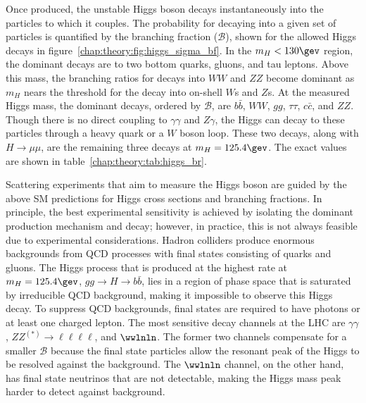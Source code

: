 Once produced, the unstable Higgs boson decays instantaneously into the
particles to which it couples. The probability for decaying into a
given set of particles is quantified by the branching fraction ($\mathscr{B}$), shown
for the allowed Higgs decays in
figure~\ref{chap:theory:fig:higgs_sigma_bf}. In the $m_H < 130 \gev$
region, the dominant decays are to two bottom quarks, gluons, and tau
leptons. Above this mass, the branching ratios for decays into $WW$ and $ZZ$
become dominant as $m_H$ nears the threshold for the decay into
on-shell $W$s and $Z$s. At the measured Higgs mass, the dominant
decays, ordered by $\mathscr{B}$, are $b\bar{b}$, $WW$, $gg$,
$\tau\tau$, $c\bar{c}$, and $ZZ$. Though there is no direct coupling to
$\gamma\gamma$ and $Z\gamma$, the Higgs can decay to these particles
through a heavy quark or a $W$ boson loop. These two decays, along
with $H\rightarrow{\mu\mu}$, are the remaining three decays at $m_H =
125.4 \gev$. The exact values are shown in
table~\ref{chap:theory:tab:higgs_br}. 

Scattering experiments that aim to measure the Higgs boson are guided
by the above SM predictions for Higgs cross sections and branching
fractions. In principle, the best experimental sensitivity is achieved
by isolating the dominant production mechanism and decay; however, in
practice, this is not always feasible due to experimental
considerations. Hadron colliders produce enormous backgrounds from QCD
processes with final states consisting of quarks and gluons. The Higgs
process that is produced at the highest rate at $m_H =
125.4 \gev$, $gg\rightarrow{H}\rightarrow{b\bar{b}}$, lies in a region
of phase space that is saturated by irreducible QCD
background, making it impossible to observe this Higgs decay. To
suppress QCD backgrounds, final states are required to have photons or
at least one charged lepton. The most sensitive decay channels at the
LHC are $\gamma\gamma$, $ZZ^{(\ast)}\rightarrow{\ell\ell\ell\ell}$,
and $\wwlnln$. The former two channels compensate for a smaller
$\mathscr{B}$ because the final state particles allow the resonant
peak of the Higgs to be resolved against the background. The $\wwlnln$
channel, on the other hand, has final state neutrinos that are not
detectable, making the Higgs mass peak harder to detect against
background. 
